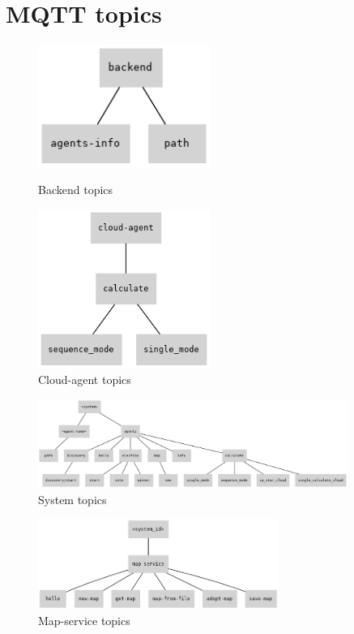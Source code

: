 \chapter{MQTT topics}
\label{sec:app_02}

\begin{figure}[H]
\centering
\begin{minipage}{0.5\textwidth}
    \centering
    \includegraphics[width=0.5\textwidth]{pictures/topic_backend.png}
    \caption{Backend topics}
    \label{fig:topics_backend}
\end{minipage}%
\begin{minipage}{0.5\textwidth}
    \centering
    \includegraphics[width=0.5\textwidth]{pictures/topic_cloud-agent.png}
    \caption{Cloud-agent topics}
    \label{fig:topics_cloud_agent}
\end{minipage}
\end{figure}


\begin{figure}[H]
    \centering
    \includegraphics[width=0.9\textwidth]{pictures/topic_system_id.png}
    \caption{System topics}
    \label{fig:topics_system_id}
\end{figure}

\begin{figure}[H]
    \centering
    \includegraphics[width=0.7\textwidth]{pictures/topic_map-service.png}
    \caption{Map-service topics}
    \label{fig:topics_map_service}
\end{figure}
